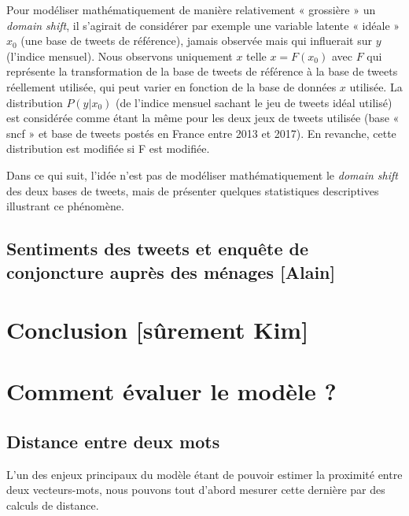 \documentclass[11pt,french,french]{article}
\begin{document}
Pour modéliser mathématiquement de manière relativement « grossière » un
\emph{domain shift}, il s'agirait de considérer par exemple une variable
latente « idéale » \(x_0\) (une base de tweets de référence), jamais
observée mais qui influerait sur \(y\) (l'indice mensuel). Nous
observons uniquement \(x\) telle \(x=F(x_0)\) avec \(F\) qui représente
la transformation de la base de tweets de référence à la base de tweets
réellement utilisée, qui peut varier en fonction de la base de données
\(x\) utilisée. La distribution \(P(y|x_0)\) (de l'indice mensuel
sachant le jeu de tweets idéal utilisé) est considérée comme étant la
même pour les deux jeux de tweets utilisée (base « sncf » et base de
tweets postés en France entre 2013 et 2017). En revanche, cette
distribution est modifiée si F est modifiée.

Dans ce qui suit, l'idée n'est pas de modéliser mathématiquement le
\emph{domain shift} des deux bases de tweets, mais de présenter quelques
statistiques descriptives illustrant ce phénomène.

\subsection{Sentiments des tweets et enquête de conjoncture auprès des
ménages
{[}Alain{]}}\label{sentiments-des-tweets-et-enquuxeate-de-conjoncture-aupruxe8s-des-muxe9nages-alain}

\section*{Conclusion {[}sûrement
Kim{]}}\label{conclusion-suxfbrement-kim}

\newpage

\appendix


\section{Comment évaluer le modèle ?}\label{annexe:commentEvaluer}

\subsection{Distance entre deux mots}\label{distance-entre-deux-mots}

L'un des enjeux principaux du modèle étant de pouvoir estimer la
proximité entre deux vecteurs-mots, nous pouvons tout d'abord mesurer
cette dernière par des calculs de distance.
\end{document}
